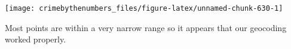 \documentclass[
]{krantz}
\makeatletter
\newenvironment{Shaded}{\begin{snugshade}}{\end{snugshade}}
\newcommand{\FunctionTok}[1]{\textcolor[rgb]{0,0,0}{#1}}
\newcommand{\NormalTok}[1]{#1}
\newcommand{\SpecialCharTok}[1]{\textcolor[rgb]{0,0,0}{#1}}
\newenvironment{kframe}{%
\medskip{}
\setlength{\fboxsep}{.8em}
 \def\at@end@of@kframe{}%
 \ifinner\ifhmode%
  \def\at@end@of@kframe{\end{minipage}}%
  \begin{minipage}{\columnwidth}%
 \fi\fi%
 \def\FrameCommand##1{\hskip\@totalleftmargin \hskip-\fboxsep
 \colorbox{shadecolor}{##1}\hskip-\fboxsep
     \hskip-\linewidth \hskip-\@totalleftmargin \hskip\columnwidth}%
 \MakeFramed {\advance\hsize-\width
   \@totalleftmargin\z@ \linewidth\hsize
   \@setminipage}}%
 {\par\unskip\endMakeFramed%
 \at@end@of@kframe}
\renewenvironment{Shaded}{\begin{kframe}}{\end{kframe}}
\makeatother
\begin{document}
\begin{Shaded}
\end{Shaded}

\begin{center}\texttt{[image: crimebythenumbers\_files/figure-latex/unnamed-chunk-630-1]} \end{center}

Most points are within a very narrow range so it appears
that our geocoding worked properly.

  

\backmatter
\printindex
\end{document}
